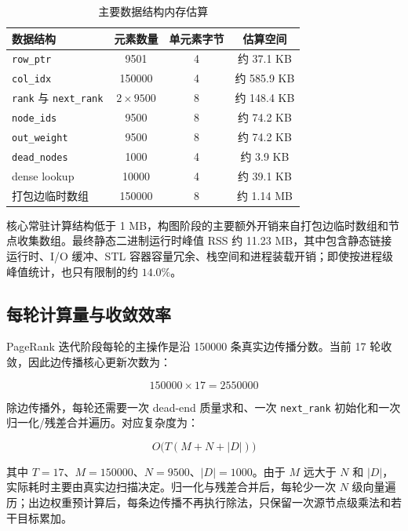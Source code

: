 \documentclass[UTF8,a4paper,10pt]{ctexart}
\begin{document}
\begin{table}[H]
  \centering
  \caption{主要数据结构内存估算}
  \small
  \begin{tabular}{l c c c}
    \toprule
    \textbf{数据结构} & \textbf{元素数量} & \textbf{单元素字节} & \textbf{估算空间} \\
    \midrule
    \texttt{row\_ptr} & 9501 & 4 & 约 37.1 KB \\
    \texttt{col\_idx} & 150000 & 4 & 约 585.9 KB \\
    \texttt{rank} 与 \texttt{next\_rank} & $2\times9500$ & 8 & 约 148.4 KB \\
    \texttt{node\_ids} & 9500 & 8 & 约 74.2 KB \\
    \texttt{out\_weight} & 9500 & 8 & 约 74.2 KB \\
    \texttt{dead\_nodes} & 1000 & 4 & 约 3.9 KB \\
    dense lookup & 10000 & 4 & 约 39.1 KB \\
    打包边临时数组 & 150000 & 8 & 约 1.14 MB \\
    \bottomrule
  \end{tabular}
\end{table}

核心常驻计算结构低于 1 MB，构图阶段的主要额外开销来自打包边临时数组和节点收集数组。最终静态二进制运行时峰值 RSS 约 11.23 MB，其中包含静态链接运行时、I/O 缓冲、STL 容器容量冗余、栈空间和进程装载开销；即使按进程级峰值统计，也只有限制的约 $14.0\%$。

\subsection{每轮计算量与收敛效率}

PageRank 迭代阶段每轮的主操作是沿 150000 条真实边传播分数。当前 17 轮收敛，因此边传播核心更新次数为：

\begin{equation}
150000\times17=2550000
\end{equation}

除边传播外，每轮还需要一次 dead-end 质量求和、一次 \texttt{next\_rank} 初始化和一次归一化/残差合并遍历。对应复杂度为：

\begin{equation}
O\bigl(T(M+N+|D|)\bigr)
\end{equation}

其中 $T=17$、$M=150000$、$N=9500$、$|D|=1000$。由于 $M$ 远大于 $N$ 和 $|D|$，实际耗时主要由真实边扫描决定。归一化与残差合并后，每轮少一次 $N$ 级向量遍历；出边权重预计算后，每条边传播不再执行除法，只保留一次源节点级乘法和若干目标累加。
\end{document}
